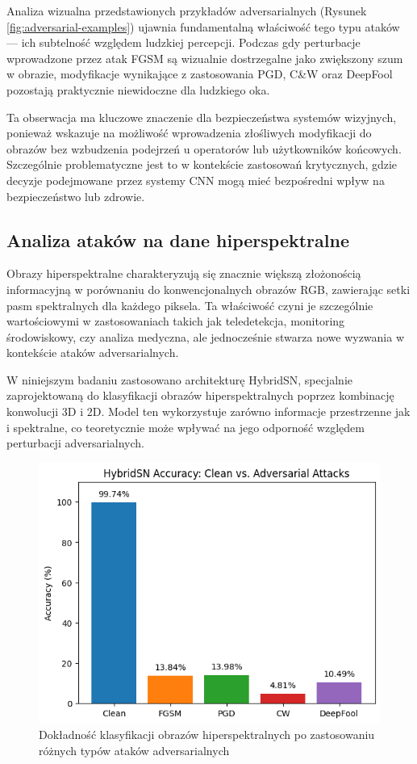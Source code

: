 \documentclass[12pt]{article}
\begin{document}
Analiza wizualna przedstawionych przykładów adversarialnych (Rysunek \ref{fig:adversarial-examples}) ujawnia fundamentalną właściwość tego typu ataków --- ich subtelność względem ludzkiej percepcji. Podczas gdy perturbacje wprowadzone przez atak FGSM są wizualnie dostrzegalne jako zwiększony szum w obrazie, modyfikacje wynikające z zastosowania PGD, C\&W oraz DeepFool pozostają praktycznie niewidoczne dla ludzkiego oka.

Ta obserwacja ma kluczowe znaczenie dla bezpieczeństwa systemów wizyjnych, ponieważ wskazuje na możliwość wprowadzenia złośliwych modyfikacji do obrazów bez wzbudzenia podejrzeń u operatorów lub użytkowników końcowych. Szczególnie problematyczne jest to w kontekście zastosowań krytycznych, gdzie decyzje podejmowane przez systemy CNN mogą mieć bezpośredni wpływ na bezpieczeństwo lub zdrowie.
\subsection{Analiza ataków na dane hiperspektralne}

Obrazy hiperspektralne charakteryzują się znacznie większą złożonością informacyjną w porównaniu do konwencjonalnych obrazów RGB, zawierając setki pasm spektralnych dla każdego piksela. Ta właściwość czyni je szczególnie wartościowymi w zastosowaniach takich jak teledetekcja, monitoring środowiskowy, czy analiza medyczna, ale jednocześnie stwarza nowe wyzwania w kontekście ataków adversarialnych.

W niniejszym badaniu zastosowano architekturę HybridSN, specjalnie zaprojektowaną do klasyfikacji obrazów hiperspektralnych poprzez kombinację konwolucji 3D i 2D. Model ten wykorzystuje zarówno informacje przestrzenne jak i spektralne, co teoretycznie może wpływać na jego odporność względem perturbacji adversarialnych.

\begin{figure}[H]
    \centering
    \includegraphics[width=1\textwidth]{hybridsn_accuracy.png} 
    \caption{Dokładność klasyfikacji obrazów hiperspektralnych po zastosowaniu różnych typów ataków adversarialnych}
    \label{fig:hyperspectral-accuracy}
\end{figure}
\end{document}
